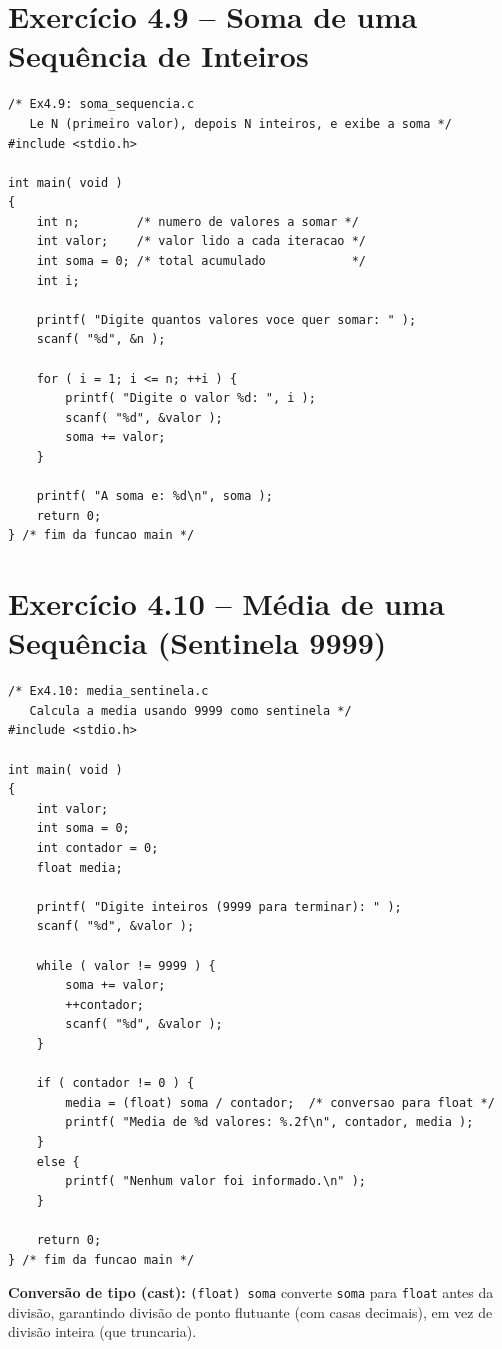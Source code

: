 \documentclass[12pt,a4paper]{article}
\begin{document}
\newpage

\section{Exercício 4.9 -- Soma de uma Sequência de Inteiros}

\begin{respostabox}
\begin{lstlisting}
/* Ex4.9: soma_sequencia.c
   Le N (primeiro valor), depois N inteiros, e exibe a soma */
#include <stdio.h>

int main( void )
{
    int n;        /* numero de valores a somar */
    int valor;    /* valor lido a cada iteracao */
    int soma = 0; /* total acumulado            */
    int i;

    printf( "Digite quantos valores voce quer somar: " );
    scanf( "%d", &n );

    for ( i = 1; i <= n; ++i ) {
        printf( "Digite o valor %d: ", i );
        scanf( "%d", &valor );
        soma += valor;
    }

    printf( "A soma e: %d\n", soma );
    return 0;
} /* fim da funcao main */
\end{lstlisting}
\end{respostabox}

\section{Exercício 4.10 -- Média de uma Sequência (Sentinela 9999)}

\begin{respostabox}
\begin{lstlisting}
/* Ex4.10: media_sentinela.c
   Calcula a media usando 9999 como sentinela */
#include <stdio.h>

int main( void )
{
    int valor;
    int soma = 0;
    int contador = 0;
    float media;

    printf( "Digite inteiros (9999 para terminar): " );
    scanf( "%d", &valor );

    while ( valor != 9999 ) {
        soma += valor;
        ++contador;
        scanf( "%d", &valor );
    }

    if ( contador != 0 ) {
        media = (float) soma / contador;  /* conversao para float */
        printf( "Media de %d valores: %.2f\n", contador, media );
    }
    else {
        printf( "Nenhum valor foi informado.\n" );
    }

    return 0;
} /* fim da funcao main */
\end{lstlisting}

\textbf{Conversão de tipo (cast):} \texttt{(float) soma} converte \texttt{soma} para
\texttt{float} antes da divisão, garantindo divisão de ponto flutuante (com casas
decimais), em vez de divisão inteira (que truncaria).
\end{respostabox}
\end{document}

